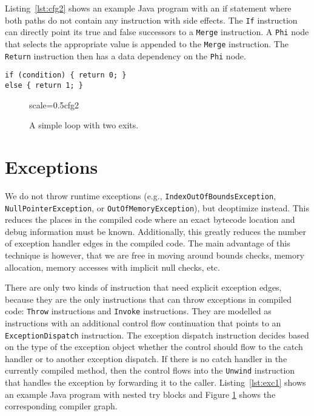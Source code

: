 \documentclass[twocolumn]{svjour3}
\begin{document}
Listing~\ref{lst:cfg2} shows an example Java program with an if statement where both paths do not contain any instruction with side effects.
The \texttt{If} instruction can directly point its true and false successors to a \texttt{Merge} instruction.
A \texttt{Phi} node that selects the appropriate value is appended to the \texttt{Merge} instruction.
The \texttt{Return} instruction then has a data dependency on the \texttt{Phi} node.

\begin{lstlisting}[label=lst:cfg2, caption=Control flow in the graph., captionpos=b]
if (condition) { return 0; }
else { return 1; }
\end{lstlisting}

\begin{figure}[h]
  \centering
\begin{digraphenv}{scale=0.5}{cfg2}
\end{digraphenv}
  \caption{A simple loop with two exits.}
  \label{fig:exc1}
\end{figure}

\section{Exceptions}
\label{sec:Exceptions}

We do not throw runtime exceptions (e.g., \texttt{IndexOutOf\-BoundsException}, \texttt{NullPointerException}, or \texttt{Out\-Of\-MemoryException}), but deoptimize instead.
This reduces the places in the compiled code where an exact bytecode location and debug information must be known.
Additionally, this greatly reduces the number of exception handler edges in the compiled code.
The main advantage of this technique is however, that we are free in moving around bounds checks, memory allocation, memory accesses with implicit null checks, etc.

There are only two kinds of instruction that need explicit exception edges, because they are the only instructions that can throw exceptions in compiled code: \texttt{Throw} instructions and \texttt{Invoke} instructions.
They are modelled as instructions with an additional control flow continuation that points to an \texttt{ExceptionDispatch} instruction.
The exception dispatch instruction decides based on the type of the exception object whether the control should flow to the catch handler or to another exception dispatch.
If there is no catch handler in the currently compiled method, then the control flows into the \texttt{Unwind} instruction that handles the exception by forwarding it to the caller.
Listing~\ref{lst:exc1} shows an example Java program with nested try blocks and Figure \ref{fig:exc1} shows the corresponding compiler graph.
\end{document}
